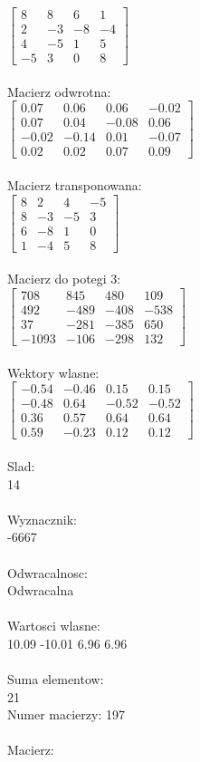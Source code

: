 \documentclass[a4paper,12pt]{article}
\begin{document}
$\begin{bmatrix} 8&8&6&1\\2&-3&-8&-4\\4&-5&1&5\\-5&3&0&8 \end{bmatrix}$
\\
\\
Macierz odwrotna:\\

$\begin{bmatrix} 0.07&0.06&0.06&-0.02\\0.07&0.04&-0.08&0.06\\-0.02&-0.14&0.01&-0.07\\0.02&0.02&0.07&0.09 \end{bmatrix}$
\\
\\
Macierz transponowana:\\

$\begin{bmatrix} 8&2&4&-5\\8&-3&-5&3\\6&-8&1&0\\1&-4&5&8 \end{bmatrix}$
\\
\\
Macierz do potegi 3:\\

$\begin{bmatrix} 708&845&480&109\\492&-489&-408&-538\\37&-281&-385&650\\-1093&-106&-298&132 \end{bmatrix}$
\\
\\
Wektory wlasne:\\

$\begin{bmatrix} -0.54&-0.46&0.15&0.15\\-0.48&0.64&-0.52&-0.52\\0.36&0.57&0.64&0.64\\0.59&-0.23&0.12&0.12 \end{bmatrix}$
\\
\\
Slad:\\
14
\\
\\
Wyznacznik:\\
-6667
\\
\\
Odwracalnosc:\\
Odwracalna
\\
\\
Wartosci wlasne:\\
10.09 -10.01 6.96 6.96
\\
\\
Suma elementow:\\
21
\\
\newpage
Numer macierzy:
197
\\
\\
Macierz:\\
\end{document}
